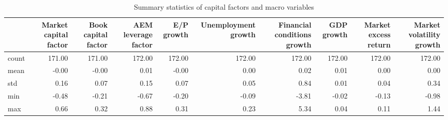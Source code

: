 \begin{table}
\caption{Summary statistics of capital factors and macro variables}
\label{tab:Table 3.1}
\begin{tabular}{lrrrrrrrrr}
\toprule
 & Market capital factor & Book capital factor & AEM leverage factor & E/P growth & Unemployment growth & Financial conditions growth & GDP growth & Market excess return & Market volatility growth \\
\midrule
count & 171.00 & 171.00 & 172.00 & 172.00 & 172.00 & 172.00 & 172.00 & 172.00 & 172.00 \\
mean & -0.00 & -0.00 & 0.01 & -0.00 & 0.00 & 0.02 & 0.01 & 0.00 & 0.00 \\
std & 0.16 & 0.07 & 0.15 & 0.07 & 0.05 & 0.84 & 0.01 & 0.04 & 0.34 \\
min & -0.48 & -0.21 & -0.67 & -0.20 & -0.09 & -3.81 & -0.02 & -0.13 & -0.98 \\
max & 0.66 & 0.32 & 0.88 & 0.31 & 0.23 & 5.34 & 0.04 & 0.11 & 1.44 \\
\bottomrule
\end{tabular}
\end{table}
